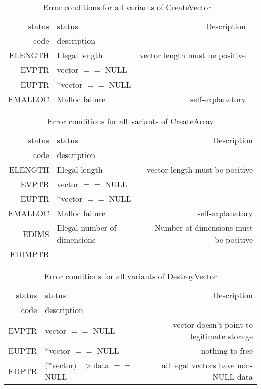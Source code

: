 \documentclass{article}
\begin{document}
\begin{table}
\begin{tabular}{|r|l|r|}\hline
status&status&Description\\
code&description&\\\hline
ELENGTH&Illegal length&vector length must be positive\\
EVPTR&vector $==$ NULL&\\
EUPTR&$*$vector $==$ NULL&\\
EMALLOC&Malloc failure&self-explanatory\\
\hline
\end{tabular}
\caption{Error conditions for all variants of CreateVector}\label{tbl:CV}
\end{table}
                                
\begin{table}
\begin{tabular}{|r|l|r|}\hline
status&status&Description\\
code&description&\\\hline
ELENGTH&Illegal length&vector length must be positive\\
EVPTR&vector $==$ NULL&\\
EUPTR&$*$vector $==$ NULL&\\
EMALLOC&Malloc failure&self-explanatory\\
EDIMS&Illegal number of dimensions&Number of dimensions must be
positive\\
EDIMPTR&\\
\hline
\end{tabular}
\caption{Error conditions for all variants of CreateArray}\label{tbl:CA}
\end{table}
                                
\begin{table}
\begin{tabular}{|r|l|r|}\hline
status&status&Description\\
code&description&\\\hline
EVPTR&vector $==$ NULL&vector doesn't point to legitimate storage\\
EUPTR&$*$vector $==$ NULL&nothing to free\\
EDPTR&$(*$vector$)->$data $==$ NULL&all legal vectors have non-NULL data\\
\hline
\end{tabular}
\caption{Error conditions for all variants of DestroyVector}\label{tbl:DV}
\end{table}
                                
\end{document}
